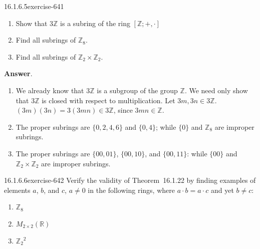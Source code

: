 \documentclass[twoside,10pt,]{book}
\numberwithin{equation}{section}
\begin{document}
\begin{divisionsolution}{16.1.6.5}{}{exercise-641}%
\hypertarget{p-5800}{}%
\leavevmode%
\begin{enumerate}[label=(\alph*)]
\item\hypertarget{li-2555}{}\hypertarget{p-5801}{}%
Show that \(3\mathbb{Z}\) is a subring of the ring \([\mathbb{Z}; +, \cdot]\)%
\item\hypertarget{li-2556}{}\hypertarget{p-5802}{}%
Find all subrings of \(\mathbb{Z}_8\).%
\item\hypertarget{li-2557}{}\hypertarget{p-5803}{}%
Find all subrings of \(\mathbb{Z}_2 \times \mathbb{Z}_2\).%
\end{enumerate}
%
\par\smallskip%
\noindent\textbf{Answer}.\quad%
\hypertarget{p-5804}{}%
\leavevmode%
\begin{enumerate}[label=(\alph*)]
\item\hypertarget{li-2558}{}\hypertarget{p-5805}{}%
We already know that \(3\mathbb{Z}\) is a subgroup of the group \(\mathbb{Z}\). We need only show that \(3\mathbb{Z}\) is closed with respect to multiplication.  Let \(3m, 3n \in  3\mathbb{Z}\). \((3m)(3n) = 3(3m n) \in  3\mathbb{Z}\), since \(3 m n \in \mathbb{Z}\).%
\item\hypertarget{li-2559}{}\hypertarget{p-5806}{}%
The proper subrings are \(\{0, 2, 4, 6\}\) and \(\{0, 4\}\); while \(\{0\}\) and \(\mathbb{Z}_8\) are improper subrings.%
\item\hypertarget{li-2560}{}\hypertarget{p-5807}{}%
The proper subrings are \(\{00, 01\}\), \(\{00, 10\}\), and \(\{00,11\}\): while \(\{00\}\) and \(\mathbb{Z}_2\times \mathbb{Z}_2\) are improper subrings.%
\end{enumerate}
%
\end{divisionsolution}%
\begin{divisionsolution}{16.1.6.6}{}{exercise-642}%
\hypertarget{p-5808}{}%
Verify the validity of Theorem~16.1.22 by finding examples of elements \(a\), \(b\), and \(c\),  \(a  \neq   0\) in the following rings, where \(a \cdot b = a \cdot  c\) and yet  \(b \neq  c\):\leavevmode%
\begin{enumerate}[label=(\alph*)]
\item\hypertarget{li-2561}{}\hypertarget{p-5809}{}%
\(\mathbb{Z}_8\)%
\item\hypertarget{li-2562}{}\hypertarget{p-5810}{}%
\(M_{2\times 2}(\mathbb{R})\)%
\item\hypertarget{li-2563}{}\hypertarget{p-5811}{}%
\(\mathbb{Z}_2{}^2\)%
\end{enumerate}
%
\end{divisionsolution}%
\end{document}
